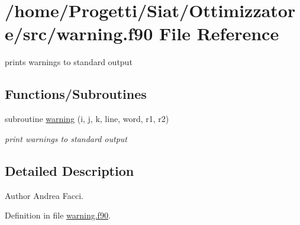 \hypertarget{warning_8f90}{\section{/home/\-Progetti/\-Siat/\-Ottimizzatore/src/warning.f90 File Reference}
\label{warning_8f90}
}


prints warnings to standard output  


\subsection*{Functions/\-Subroutines}
\begin{DoxyCompactItemize}
\item 
subroutine \hyperlink{warning_8f90_ad7335e6f906b46bf4211928111c616fd}{warning} (i, j, k, line, word, r1, r2)
\begin{DoxyCompactList}\small\item\em print warnings to standard output \end{DoxyCompactList}\end{DoxyCompactItemize}


\subsection{Detailed Description}
\begin{DoxyAuthor}{Author}
Andrea Facci. 
\end{DoxyAuthor}


Definition in file \hyperlink{warning_8f90_source}{warning.\-f90}.



